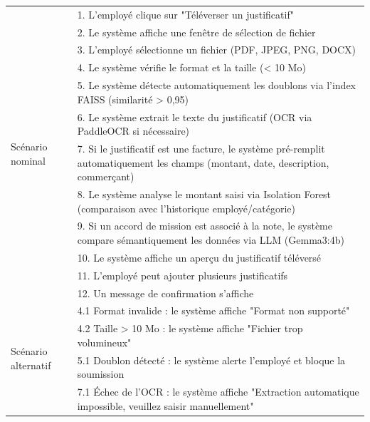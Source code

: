 \documentclass[12pt,a4paper]{report}
\begin{document}
\begin{longtable}{|p{3cm}|p{11cm}|}
\hline

\multirow{12}{*}{Scénario nominal} & 1. L'employé clique sur "Téléverser un justificatif" \\

& 2. Le système affiche une fenêtre de sélection de fichier \\

& 3. L'employé sélectionne un fichier (PDF, JPEG, PNG, DOCX) \\

& 4. Le système vérifie le format et la taille (< 10 Mo) \\

& 5. Le système détecte automatiquement les doublons via l'index FAISS (similarité > 0,95) \\

& 6. Le système extrait le texte du justificatif (OCR via PaddleOCR si nécessaire) \\

& 7. Si le justificatif est une facture, le système pré-remplit automatiquement les champs (montant, date, description, commerçant) \\

& 8. Le système analyse le montant saisi via Isolation Forest (comparaison avec l'historique employé/catégorie) \\

& 9. Si un accord de mission est associé à la note, le système compare sémantiquement les données via LLM (Gemma3:4b) \\

& 10. Le système affiche un aperçu du justificatif téléversé \\

& 11. L'employé peut ajouter plusieurs justificatifs \\

& 12. Un message de confirmation s'affiche \\

\hline

\multirow{6}{*}{Scénario alternatif} & 4.1 Format invalide : le système affiche "Format non supporté" \\

& 4.2 Taille > 10 Mo : le système affiche "Fichier trop volumineux" \\

& 5.1 Doublon détecté : le système alerte l'employé et bloque la soumission \\

& 7.1 Échec de l'OCR : le système affiche "Extraction automatique impossible, veuillez saisir manuellement" \\


\end{longtable}
\end{document}
